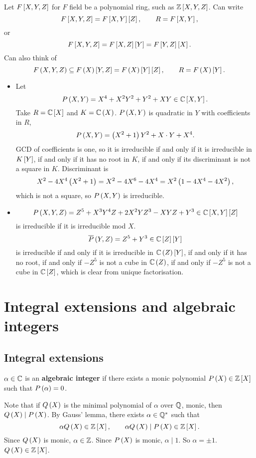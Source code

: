 \begin{example2}
Let $ F\sb{X, Y, Z} $ for $ F $ field be a polynomial ring, such as $ \Z\sb{X, Y, Z} $. Can write
$$ F\sb{X, Y, Z} = F\sb{X, Y}\sb{Z}, \qquad R = F\sb{X, Y}, $$
or
$$ F\sb{X, Y, Z} = F\sb{X, Z}\sb{Y} = F\sb{Y, Z}\sb{X}. $$
Can also think of
$$ F\rb{X, Y, Z} \subseteq F\rb{X}\sb{Y, Z} = F\rb{X}\sb{Y}\sb{Z}, \qquad R = F\rb{X}\sb{Y}. $$
\begin{itemize}
\item Let
$$ P\rb{X, Y} = X^4 + X^2Y^2 + Y^2 + XY \in \C\sb{X, Y}. $$
Take $ R = \C\sb{X} $ and $ K = \C\rb{X} $. $ P\rb{X, Y} $ is quadratic in $ Y $ with coefficients in $ R $,
$$ P\rb{X, Y} = \rb{X^2 + 1}Y^2 + X \cdot Y + X^4. $$
GCD of coefficients is one, so it is irreducible if and only if it is irreducible in $ K\sb{Y} $, if and only if it has no root in $ K $, if and only if its discriminant is not a square in $ K $. Discriminant is
$$ X^2 - 4X^4\rb{X^2 + 1} = X^2 - 4X^6 - 4X^4 = X^2\rb{1 - 4X^4 - 4X^2}, $$
which is not a square, so $ P\rb{X, Y} $ is irreducible.
\item
$$ P\rb{X, Y, Z} = Z^5 + X^3Y^4Z + 2X^2YZ^3 - XYZ + Y^3 \in \C\sb{X, Y}\sb{Z} $$
is irreducible if it is irreducible mod $ X $.
$$ \overline{P}\rb{Y, Z} = Z^5 + Y^3 \in \C\sb{Z}\sb{Y} $$
is irreducible if and only if it is irreducible in $ \C\rb{Z}\sb{Y} $, if and only if it has no root, if and only if $ -Z^5 $ is not a cube in $ \C\rb{Z} $, if and only if $ -Z^5 $ is not a cube in $ \C\sb{Z} $, which is clear from unique factorisation.
\end{itemize}
\end{example2}

\pagebreak

\section{Integral extensions and algebraic integers}

\subsection{Integral extensions}

\begin{definition}
$ \alpha \in \C $ is an \textbf{algebraic integer} if there exists a monic polynomial $ P\rb{X} \in \Z\sb{X} $ such that $ P\rb{\alpha} = 0 $.
\end{definition}

Note that if $ Q\rb{X} $ is the minimal polynomial of $ \alpha $ over $ \Q $, monic, then $ Q\rb{X} \mid P\rb{X} $. By Gauss' lemma, there exists $ \alpha \in \Q^* $ such that
$$ \alpha Q\rb{X} \in \Z\sb{X}, \qquad \alpha Q\rb{X} \mid P\rb{X} \in \Z\sb{X}. $$
Since $ Q\rb{X} $ is monic, $ \alpha \in \Z $. Since $ P\rb{X} $ is monic, $ \alpha \mid 1 $. So $ \alpha = \pm 1 $. $ Q\rb{X} \in \Z\sb{X} $.

